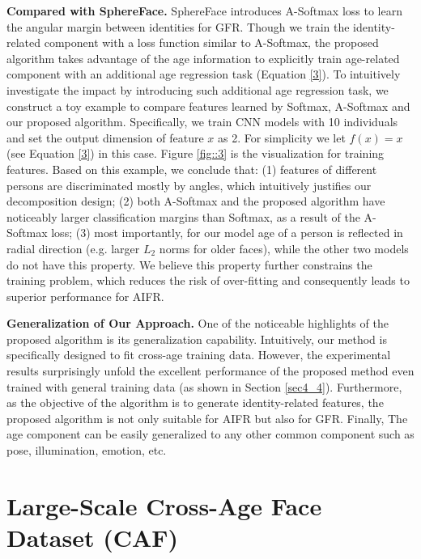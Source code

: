 \documentclass[runningheads]{llncs}
\begin{document}
\textbf{Compared with SphereFace.}
SphereFace \cite{sphereface} introduces A-Softmax loss to learn the angular margin between identities for GFR. Though we train the identity-related component with a loss function similar to A-Softmax, the proposed algorithm takes advantage of the age information to explicitly train age-related component with an additional age regression task (Equation \ref{3}). To intuitively investigate the impact by introducing such additional age regression task, we construct a toy example to compare features learned by Softmax, A-Softmax and our proposed algorithm. Specifically, we train CNN models with 10 individuals and set the output dimension of feature $x$ as 2. For simplicity we let $f(x) = x$ (see Equation \ref{3}) in this case. Figure \ref{fig::3} is the visualization for training features. Based on this example, we conclude that: (1) features of different persons are discriminated mostly by angles, which intuitively justifies our decomposition design; (2) both A-Softmax and the proposed algorithm have noticeably larger classification margins than Softmax, as a result of the A-Softmax loss;  (3) most importantly, for our model age of a person is reflected in radial direction (e.g. larger $L_2$ norms for older faces), while the other two models do not have this property. We believe this property further constrains the training problem, which reduces the risk of over-fitting and consequently leads to superior performance for AIFR.


\textbf{Generalization of Our Approach.}
One of the noticeable highlights of the proposed algorithm is its generalization capability.
Intuitively, our method is specifically designed to fit cross-age training data.
However, the experimental results surprisingly unfold the excellent performance of the proposed method even trained with general training data (as shown in Section \ref{sec4_4}).
Furthermore, as the objective of the algorithm is to generate identity-related features, the proposed algorithm is not only suitable for AIFR but also for GFR.
Finally, The age component can be easily generalized to any other common component such as pose, illumination, emotion, etc.




\section{Large-Scale Cross-Age Face Dataset (CAF)}
\label{sec4}
\end{document}
